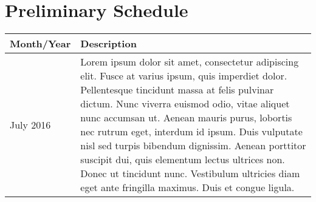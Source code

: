 %
\chapter{Preliminary Schedule}
\label{sec:schedule}



%


\begin{table}[ht]
\centering

\begin{tabularx}{\linewidth}{
    |>{\hsize=0.5\hsize}X|%
    >{\hsize=1.5\hsize}X|%
} \hline

 \textbf{Month/Year} & \textbf{Description} \\ \hline
 July 2016      & Lorem ipsum dolor sit amet, consectetur adipiscing elit. Fusce at varius ipsum, quis imperdiet dolor. Pellentesque tincidunt massa at felis pulvinar dictum. Nunc viverra euismod odio, vitae aliquet nunc accumsan ut. Aenean mauris purus, lobortis nec rutrum eget, interdum id ipsum. Duis vulputate nisl sed turpis bibendum dignissim. Aenean porttitor suscipit dui, quis elementum lectus ultrices non. Donec ut tincidunt nunc. Vestibulum ultricies diam eget ante fringilla maximus. Duis et congue ligula.


\end{tabularx}
\end{table}
